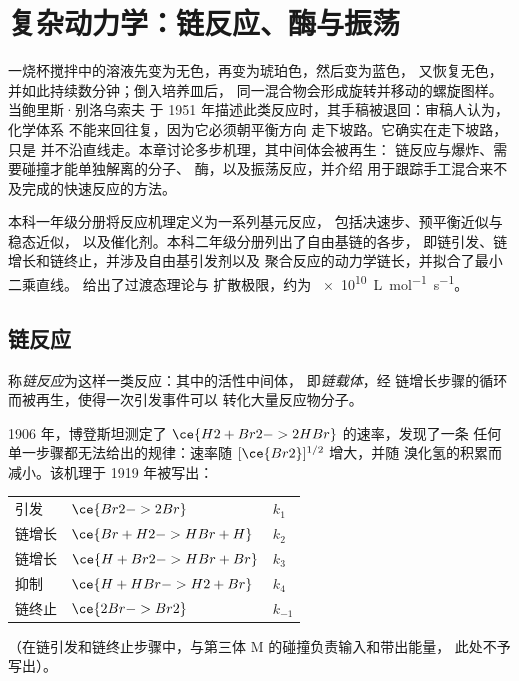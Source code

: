 \chapter{复杂动力学：链反应、酶与振荡}\label{ch:b3:complex-kinetics}

一烧杯搅拌中的溶液先变为无色，再变为琥珀色，然后变为蓝色，
又恢复无色，并如此持续数分钟；倒入培养皿后，
同一混合物会形成旋转并移动的螺旋图样。当鲍里斯·别洛乌索夫
于 1951 年描述此类反应时，其手稿被退回：审稿人认为，化学体系
不能来回往复，因为它必须朝平衡方向
走下坡路。它确实在走下坡路，只是
并不沿直线走。本章讨论多步机理，其中间体会被再生：
链反应与爆炸、需要碰撞才能单独解离的分子、
酶，以及振荡反应，并介绍
用于跟踪手工混合来不及完成的快速反应的方法。

\begin{recall}
本科一年级分册将反应机理定义为一系列基元反应，
包括决速步、预平衡近似与稳态近似，
以及催化剂。本科二年级分册列出了自由基链的各步，
即链引发、链增长和链终止，并涉及自由基引发剂以及
聚合反应的动力学链长，并拟合了最小二乘直线。
给出了过渡态理论与
扩散极限，约为 \qty{e10}{L.mol^{-1}.s^{-1}}。
\end{recall}

\section{链反应}

\begin{definition}\label{def:b3:complex-kinetics:chain}
称\emph{链反应}为这样一类反应：其中的活性中间体，
即\emph{链载体}，经
链增长步骤的循环而被再生，使得一次引发事件可以
转化大量反应物分子。
\end{definition}

1906 年，博登斯坦测定了 $\ce{H2 + Br2 -> 2 HBr}$ 的速率，发现了一条
任何单一步骤都无法给出的规律：速率随 $[\ce{Br2}]^{1/2}$ 增大，并随
溴化氢的积累而减小。该机理于 1919 年被写出：
\begin{center}
\begin{tabular}{lll}
引发 & $\ce{Br2 -> 2 Br}$ & $k_1$ \\
链增长 & $\ce{Br + H2 -> HBr + H}$ & $k_2$ \\
链增长 & $\ce{H + Br2 -> HBr + Br}$ & $k_3$ \\
抑制 & $\ce{H + HBr -> H2 + Br}$ & $k_4$ \\
链终止 & $\ce{2 Br -> Br2}$ & $k_{-1}$
\end{tabular}
\end{center}
（在链引发和链终止步骤中，与第三体 M 的碰撞负责输入和带出能量，
此处不予写出）。

